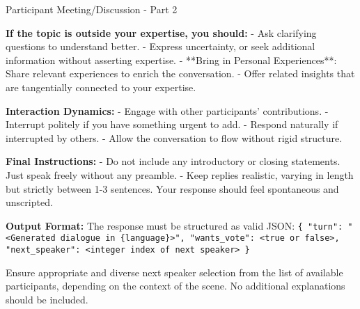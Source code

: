 \begin{figure*}[t]
\begin{AIbox}{Participant Meeting/Discussion - Part 2}
{        \textbf{If the topic is outside your expertise, you should:}\newline
        - Ask clarifying questions to understand better.\newline
        - Express uncertainty, or seek additional information without asserting expertise.\newline
        - **Bring in Personal Experiences**: Share relevant experiences to enrich the conversation.\newline
        - Offer related insights that are tangentially connected to your expertise.\newline

        \textbf{Interaction Dynamics:}\newline
        - Engage with other participants' contributions.\newline
        - Interrupt politely if you have something urgent to add.\newline
        - Respond naturally if interrupted by others.\newline
        - Allow the conversation to flow without rigid structure.\newline

        \textbf{Final Instructions:}\newline
        - Do not include any introductory or closing statements. Just speak freely without any preamble.\newline
        - Keep replies realistic, varying in length but strictly between 1-3 sentences. Your response should feel spontaneous and unscripted.\newline

        \textbf{Output Format:}\newline
        The response must be structured as valid JSON:\newline
        \texttt{\{\newline
          "turn": "<Generated dialogue in \{language\}>", "wants\_vote": <true or false>,\newline
          "next\_speaker": <integer index of next speaker>\newline
        \}}\newline
        
        Ensure appropriate and diverse next speaker selection from the list of available participants, depending on the context of the scene. No additional explanations should be included.
    }
    \end{AIbox}
    \caption{Participant Meeting/Discussion - Part 2}
    \label{fig:participant_meeting_discussion_2}
\end{figure*}

